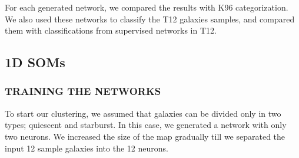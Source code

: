     For each generated network, we compared the results with K96 categorization.
    We also used these networks to classify the T12 galaxies samples, and compared them with classifications from supervised networks in T12.
    \subsection{1D SOMs}
    \label{sec: 1D}
        \subsubsection{TRAINING THE NETWORKS}
        \label{sec: 1Dt}
            To start our clustering, we assumed that galaxies can be divided only in two types; quiescent and starburst.
            In this case, we generated a network with only two neurons.
            We increased the size of the map gradually till we separated the input 12 sample galaxies into the 12 neurons. 
        
